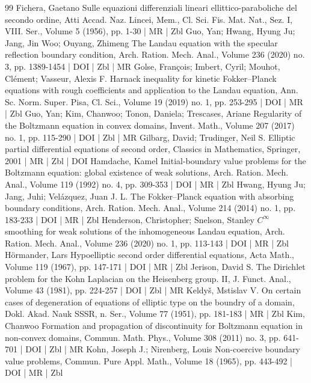 \documentclass[10pt]{amsart}
\theoremstyle{definition}\newtheorem{defi}[theo]{Definition}\newtheorem{rema}[theo]{Remark}\newtheorem{exam}[theo]{Example}\newtheorem{exem}[theo]{Example}\newtheorem{nota}[theo]{Notation}
\begin{document}
\begin{thebibliography}{99}
 Fichera, Gaetano Sulle equazioni differenziali lineari ellittico-paraboliche del secondo ordine, Atti Accad. Naz. Lincei, Mem., Cl. Sci. Fis. Mat. Nat., Sez. I, VIII. Ser., Volume 5 (1956), pp. 1-30 | MR | Zbl
 Guo, Yan; Hwang, Hyung Ju; Jang, Jin Woo; Ouyang, Zhimeng The Landau equation with the specular reflection boundary condition, Arch. Ration. Mech. Anal., Volume 236 (2020) no. 3, pp. 1389-1454 | DOI | Zbl | MR
 Golse, François; Imbert, Cyril; Mouhot, Clément; Vasseur, Alexis F. Harnack inequality for kinetic Fokker–Planck equations with rough coefficients and application to the Landau equation, Ann. Sc. Norm. Super. Pisa, Cl. Sci., Volume 19 (2019) no. 1, pp. 253-295 | DOI | MR | Zbl
 Guo, Yan; Kim, Chanwoo; Tonon, Daniela; Trescases, Ariane Regularity of the Boltzmann equation in convex domains, Invent. Math., Volume 207 (2017) no. 1, pp. 115-290 | DOI | Zbl | MR
 Gilbarg, David; Trudinger, Neil S. Elliptic partial differential equations of second order, Classics in Mathematics, Springer, 2001 | MR | Zbl | DOI
 Hamdache, Kamel Initial-boundary value problems for the Boltzmann equation: global existence of weak solutions, Arch. Ration. Mech. Anal., Volume 119 (1992) no. 4, pp. 309-353 | DOI | MR | Zbl
 Hwang, Hyung Ju; Jang, Juhi; Velázquez, Juan J. L. The Fokker–Planck equation with absorbing boundary conditions, Arch. Ration. Mech. Anal., Volume 214 (2014) no. 1, pp. 183-233 | DOI | MR | Zbl
 Henderson, Christopher; Snelson, Stanley ${C}^\infty $ smoothing for weak solutions of the inhomogeneous Landau equation, Arch. Ration. Mech. Anal., Volume 236 (2020) no. 1, pp. 113-143 | DOI | MR | Zbl
 Hörmander, Lars Hypoelliptic second order differential equations, Acta Math., Volume 119 (1967), pp. 147-171 | DOI | MR | Zbl
 Jerison, David S. The Dirichlet problem for the Kohn Laplacian on the Heisenberg group. II, J. Funct. Anal., Volume 43 (1981), pp. 224-257 | DOI | Zbl | MR
 Keldyš, Mstislav V. On certain cases of degeneration of equations of elliptic type on the boundry of a domain, Dokl. Akad. Nauk SSSR, n. Ser., Volume 77 (1951), pp. 181-183 | MR | Zbl
 Kim, Chanwoo Formation and propagation of discontinuity for Boltzmann equation in non-convex domains, Commun. Math. Phys., Volume 308 (2011) no. 3, pp. 641-701 | DOI | Zbl | MR
 Kohn, Joseph J.; Nirenberg, Louis Non-coercive boundary value problems, Commun. Pure Appl. Math., Volume 18 (1965), pp. 443-492 | DOI | MR | Zbl

\end{thebibliography}
\end{document}
